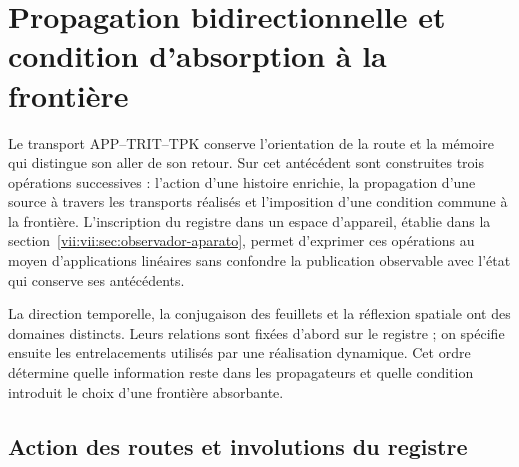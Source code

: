 
\section{Propagation bidirectionnelle et condition d'absorption à la frontière}
\label{vii:vii:sec:propagacion-bidireccional}

Le transport APP--TRIT--TPK conserve l'orientation de la route et la mémoire qui distingue son aller de son retour. Sur cet antécédent sont construites trois opérations successives : l'action d'une histoire enrichie, la propagation d'une source à travers les transports réalisés et l'imposition d'une condition commune à la frontière. L'inscription du registre dans un espace d'appareil, établie dans la section~\ref{vii:vii:sec:observador-aparato}, permet d'exprimer ces opérations au moyen d'applications linéaires sans confondre la publication observable avec l'état qui conserve ses antécédents.

La direction temporelle, la conjugaison des feuillets et la réflexion spatiale
ont des domaines distincts. Leurs relations sont fixées d'abord sur le registre ;
on spécifie ensuite les entrelacements utilisés par une réalisation
dynamique. Cet ordre détermine quelle information reste dans les propagateurs
et quelle condition introduit le choix d'une frontière absorbante.

\subsection{Action des routes et involutions du registre}
\label{vii:vii:subsec:accion-bidireccional}

